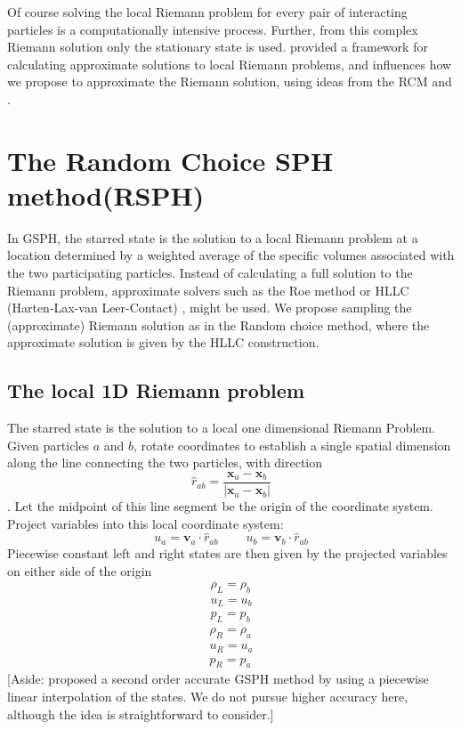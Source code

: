 \documentclass[preprint,12pt,authoryear]{elsarticle}
\begin{document}
Of course solving the local Riemann problem for every pair of interacting particles is a computationally intensive process. Further, from this complex Riemann solution only the stationary state is used. \citet{hll} provided a framework for calculating approximate solutions to local Riemann problems, and influences how we propose to approximate the  Riemann solution, using ideas from the RCM and \citet{hartenlax}.

\section{The Random Choice SPH method(RSPH)} \label{sec:RSPH-method}
In GSPH, the starred state is the solution to a local Riemann problem at a location determined by a weighted average of the specific volumes associated with the two participating particles. 
Instead of calculating a full solution to the Riemann problem, approximate solvers such as the Roe method \citep{roe1981approximate} or HLLC (Harten-Lax-van Leer-Contact) \citep{toro1994restoration}, might be used. 
We propose sampling the (approximate) Riemann solution as in the Random choice method, where the approximate solution is given by the HLLC construction.

\subsection{The local 1D Riemann problem} \label{sec:RP-construction}
The starred state is the solution to a local one dimensional Riemann Problem. Given particles $a$ and $b$, rotate coordinates to establish a single spatial dimension along the line connecting the two particles, with direction 
\begin{equation}
\hat{r}_{a b}= \frac{\textbf{x}_{a} - \textbf{x}_{ b}}{|\textbf{x}_{a} - \textbf{x}_{ b}|}
\end{equation}. 
Let the midpoint of this line segment be the origin of the coordinate system. Project variables into this local coordinate system:
\begin{equation}
u_{a}= \textbf{v}_{a} \cdot \hat{r}_{a b}
~~~~~~~~~~
u_{b}= \textbf{v}_{b} \cdot \hat{r}_{a b}
\label{eq:RP-project-2-local}
\end{equation}
Piecewise constant left and right states are then given by the projected variables on either side of the origin
\begin{eqnarray}
\rho_L = \rho_b 
\label{eq:Riemann-Prob-define-L-rho} \\
u_L = u_b 
\label{eq:Riemann-Prob-define-L-v} \\
p_L = p_b 
\label{eq:Riemann-Prob-define-L-p}
\end{eqnarray}
\begin{eqnarray}
\rho_R = \rho_a 
\label{eq:Riemann-Prob-define-R-rho} \\
u_R = u_a 
\label{eq:Riemann-Prob-define-R-v} \\
p_R = p_a 
\label{eq:Riemann-Prob-define-R-p}
\end{eqnarray}
[Aside:  \citet{inutsuka2002reformulation} proposed a second order accurate GSPH method by using
a piecewise linear interpolation of the states. We do not pursue higher accuracy here, although the idea is straightforward to consider.]
\end{document}
